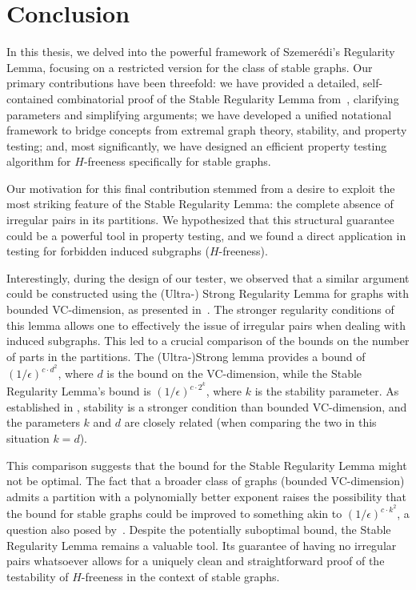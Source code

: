\section{Conclusion} \label{sec:conclusion}
    In this thesis, we delved into the powerful framework of Szemerédi's Regularity Lemma,
    focusing on a restricted version for the class of stable graphs.
    Our primary contributions have been threefold: we have provided a detailed, self-contained combinatorial proof of the Stable
    Regularity Lemma from~\cite{regularity_lemmas_for_stable_graphs}, clarifying parameters and simplifying arguments;
    we have developed a unified notational framework to bridge concepts from extremal graph theory, stability,
    and property testing; and, most significantly, we have designed an efficient property testing algorithm for
    $H$-freeness specifically for stable graphs.

    Our motivation for this final contribution stemmed from a desire to exploit the most striking feature of the Stable
    Regularity Lemma: the complete absence of irregular pairs in its partitions.
    We hypothesized that this structural guarantee could be a powerful tool in property testing, and we found a
    direct application in testing for forbidden induced subgraphs ($H$-freeness).

    Interestingly, during the design of our tester, we observed that a similar argument could be constructed using the
    (Ultra-) Strong Regularity Lemma for graphs with bounded VC-dimension, as presented
    in~\cite{regularity_partitions_and_the_topology_of_graphons}.
    The stronger regularity conditions of this lemma allows one to effectively  the issue of irregular
    pairs when dealing with induced subgraphs.
    This led to a crucial comparison of the bounds on the number of parts in the partitions.
    The (Ultra-)Strong lemma provides a bound of $(1/\epsilon)^{c \cdot d^2}$, where $d$ is the bound on the VC-dimension,
    while the Stable Regularity Lemma's bound is $(1/\epsilon)^{c \cdot 2^k}$, where $k$ is the stability parameter.
    As established in , stability is a stronger condition than bounded VC-dimension,
    and the parameters $k$ and $d$ are closely related (when comparing the two in this situation $k=d$).

    This comparison suggests that the bound for the Stable Regularity Lemma might not be optimal.
    The fact that a broader class of graphs (bounded VC-dimension) admits a partition with a polynomially better
    exponent raises the possibility that the bound for stable graphs could be improved to something akin to
    $(1/\epsilon)^{c \cdot k^2}$, a question also posed by~\cite{julia_wolf_private_comunication}.
    Despite the potentially suboptimal bound, the Stable Regularity Lemma remains a valuable tool.
    Its guarantee of having no irregular pairs whatsoever allows for a uniquely clean and straightforward
    proof of the testability of $H$-freeness in the context of stable graphs.

